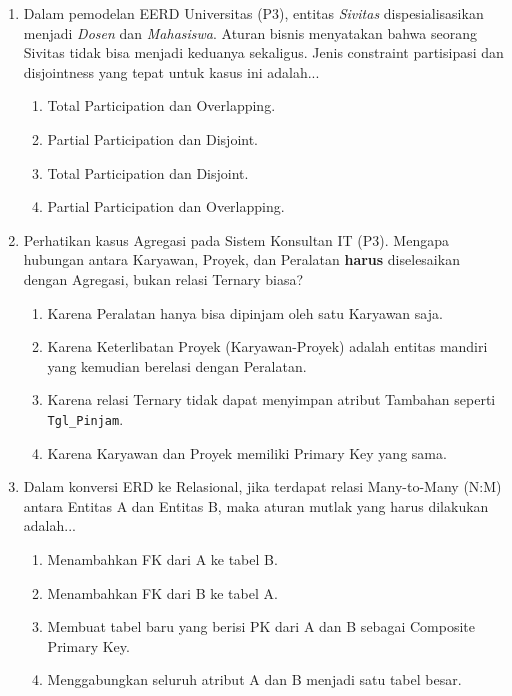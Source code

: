\documentclass[11pt,a4paper]{article}
\begin{document}
\begin{enumerate}
	\item Dalam pemodelan EERD Universitas (P3), entitas \textit{Sivitas} dispesialisasikan menjadi \textit{Dosen} dan \textit{Mahasiswa}. Aturan bisnis menyatakan bahwa seorang Sivitas tidak bisa menjadi keduanya sekaligus. Jenis constraint partisipasi dan disjointness yang tepat untuk kasus ini adalah...
	      \begin{enumerate}[label=\Alph*.]
		      \item Total Participation dan Overlapping.
		      \item Partial Participation dan Disjoint.
		      \item Total Participation dan Disjoint.
		      \item Partial Participation dan Overlapping.
	      \end{enumerate}

	\item Perhatikan kasus Agregasi pada Sistem Konsultan IT (P3). Mengapa hubungan antara Karyawan, Proyek, dan Peralatan \textbf{harus} diselesaikan dengan Agregasi, bukan relasi Ternary biasa?
	      \begin{enumerate}[label=\Alph*.]
		      \item Karena Peralatan hanya bisa dipinjam oleh satu Karyawan saja.
		      \item Karena Keterlibatan Proyek (Karyawan-Proyek) adalah entitas mandiri yang kemudian berelasi dengan Peralatan.
		      \item Karena relasi Ternary tidak dapat menyimpan atribut Tambahan seperti \texttt{Tgl\_Pinjam}.
		      \item Karena Karyawan dan Proyek memiliki Primary Key yang sama.
	      \end{enumerate}

	\item Dalam konversi ERD ke Relasional, jika terdapat relasi Many-to-Many (N:M) antara Entitas A dan Entitas B, maka aturan mutlak yang harus dilakukan adalah...
	      \begin{enumerate}[label=\Alph*.]
		      \item Menambahkan FK dari A ke tabel B.
		      \item Menambahkan FK dari B ke tabel A.
		      \item Membuat tabel baru yang berisi PK dari A dan B sebagai Composite Primary Key.
		      \item Menggabungkan seluruh atribut A dan B menjadi satu tabel besar.
	      \end{enumerate}


\end{enumerate}
\end{document}
